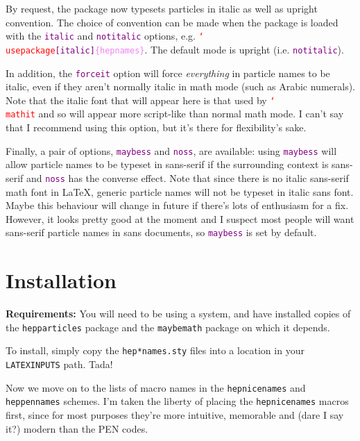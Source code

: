 \documentclass[12pt]{scrartcl}
\newcommand{\texcmd}[1]{\textcolor{red}{\texttt{\char`\\#1}}}
\newcommand{\texopt}[1]{\textcolor{purple}{\texttt{#1}}}
\newcommand{\texopts}[1]{\textcolor{purple}{\texttt{[#1]}}}
\newcommand{\texargs}[1]{\textcolor{violet}{\texttt{\{#1\}}}}
\newcommand{\texpkg}[1]{\texttt{#1}}
\DeclareRobustCommand{\hepparticles}{\texpkg{hepparticles}\xspace}
\DeclareRobustCommand{\heppennames}{\texpkg{heppennames}\xspace}
\DeclareRobustCommand{\hepnicenames}{\texpkg{hepnicenames}\xspace}
\begin{document}
By request, the package now typesets particles in italic as well as upright
convention. The choice of convention can be made when the package is loaded with
the \texopt{italic} and \texopt{notitalic} options, e.g.
\texcmd{usepackage\texopts{italic}\texargs{hepnames}}. The default mode is
upright (i.e.  \texopt{notitalic}).

In addition, the \texopt{forceit} option will force \emph{everything} in
particle names to be italic, even if they aren't normally italic in math mode
(such as Arabic numerals). Note that the italic font that will appear here is
that used by \texcmd{mathit} and so will appear more script-like than normal
math mode. I can't say that I recommend using this option, but it's there for
flexibility's sake.

Finally, a pair of options, \texopt{maybess} and \texopt{noss}, are available:
using \texopt{maybess} will allow particle names to be typeset in sans-serif if
the surrounding context is sans-serif and \texopt{noss} has the converse effect.
Note that since there is no italic sans-serif math font in LaTeX, generic
particle names will not be typeset in italic sans font. Maybe this behaviour
will change in future if there's lots of enthusiasm for a fix. However, it looks
pretty good at the moment and I suspect most people will want sans-serif
particle names in sans documents, so \texopt{maybess} is set by default.


\section{Installation}
\textbf{Requirements:} You will need to be using a \LaTeXe{} system, and 
have installed copies of the \hepparticles package and the \texpkg{maybemath} 
package on which it depends.

To install, simply copy the \texttt{hep*names.sty} files into a location in
your \texttt{LATEXINPUTS} path. Tada!

Now we move on to the lists of macro names in the \hepnicenames and \heppennames
schemes. I'm taken the liberty of placing the \hepnicenames macros first, since
for most purposes they're more intuitive, memorable and (dare I say it?) modern
than the PEN codes.
\end{document}
